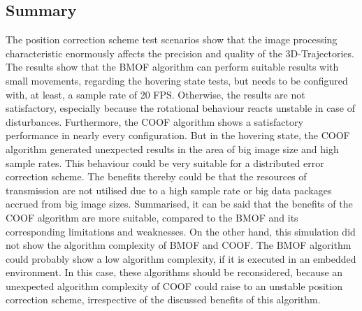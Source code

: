 \subsection{Summary}
The position correction scheme test scenarios show that the image processing characteristic enormously affects the precision and quality of the 3D-Trajectories. The results show that the \gls{BMOF} algorithm can perform suitable results with small movements, regarding the hovering state tests, but needs to be configured with, at least, a sample rate of 20 \gls{FPS}. Otherwise, the results are not satisfactory, especially because the rotational behaviour reacts unstable in case of disturbances. Furthermore, the \gls{COOF} algorithm shows a satisfactory  performance in nearly every configuration. But in the hovering state, the \gls{COOF} algorithm generated unexpected results in the area of big image size and high sample rates. This behaviour could be very suitable for a distributed error correction scheme. The benefits thereby could be that the resources of transmission are not utilised due to a high sample rate or big data packages accrued from big image sizes.
Summarised, it can be said that the benefits of the \gls{COOF} algorithm are more suitable, compared to the \gls{BMOF} and its corresponding limitations and weaknesses. On the other hand, this simulation did not show the algorithm complexity of \gls{BMOF} and \gls{COOF}. The 
\gls{BMOF} algorithm could probably show a low algorithm complexity, if it is executed in an embedded environment. In this case, these algorithms should be reconsidered, because an unexpected algorithm complexity of \gls{COOF} could raise to an unstable position correction scheme, irrespective of  the discussed benefits of this algorithm.


